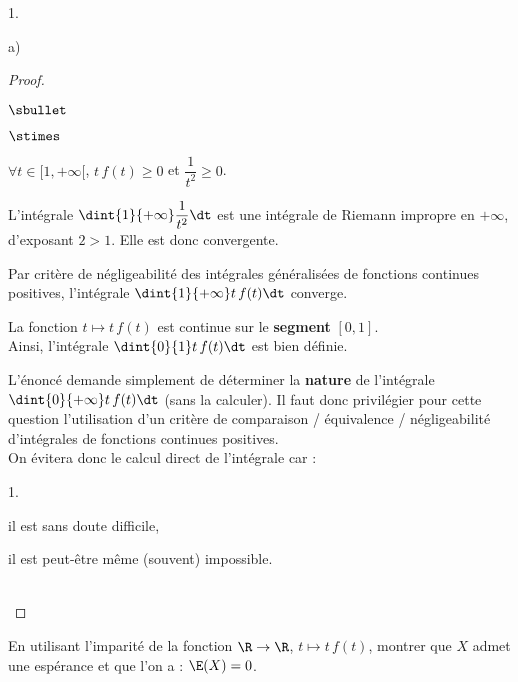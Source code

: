 \begin{noliste}{1.}
\begin{noliste}{a)}
\begin{proof}
\begin{noliste}{$\sbullet$}
\begin{noliste}{$\stimes$}
  \item $\forall t\in[1,+\infty[$, $t\, f(t) \geq 0$ \quad et \quad
    $\dfrac{1}{t^2}\geq 0$.
  \item L'intégrale $\dint{1}{+\infty} \dfrac{1}{t^2}\dt$ est une
    intégrale de Riemann impropre en $+\infty$, d'exposant $2>1$.
    Elle est donc convergente.
  \end{noliste}
  Par critère de négligeabilité des intégrales généralisées de 
  fonctions continues positives, l'intégrale $\dint{1}{+\infty} t\, 
  f(t)\dt$ converge.
  

  
  \newpage
  
  
\item La fonction $t\mapsto t\, f(t)$ est continue sur le {\bf
    segment} $[0,1]$.\\
  Ainsi, l'intégrale $\dint{0}{1} t\, f(t)\dt$ est bien définie.
 \end{noliste}
 
 \begin{remark}%
  L'énoncé demande simplement de déterminer la {\bf nature} de 
  l'intégrale $\dint{0}{+\infty} t\, f(t)\dt$ (sans la calculer). Il 
  faut donc privilégier pour cette question l'utilisation d'un critère 
  de comparaison / équivalence / négligeabilité d'intégrales de 
  fonctions continues positives.\\
  On évitera donc le calcul direct de l'intégrale car :
  \begin{noliste}{\scriptsize 1.}
   \item il est sans doute difficile,
   \item il est peut-être même (souvent) impossible.
  \end{noliste}
 \end{remark}~\\[-1.4cm]
\end{proof}

\item En utilisant l'imparité de la fonction $\R\to \R$, $t\mapsto t
  \, f(t)$, montrer que $X$ admet une espérance et que l'on a :
  $\E(X)=0$.


\end{noliste}
\end{noliste}

